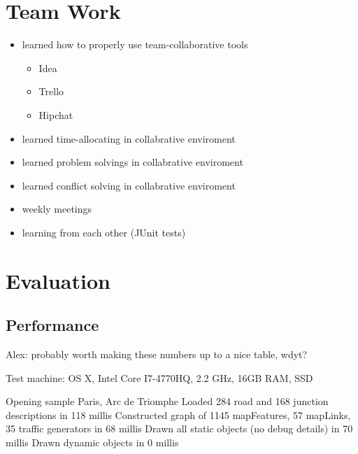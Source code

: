 \section{Team Work}

    \begin{itemize}
        \item learned how to properly use team-collaborative tools

            \begin{itemize}
                \item Idea
                \item Trello
                \item Hipchat
         \end{itemize}
        \item learned time-allocating in collabrative enviroment
        \item learned  problem solvings in collabrative enviroment
        \item learned  conflict solving in collabrative enviroment
        \item weekly meetings
        \item learning from each other (JUnit tests)

    \end {itemize}

\section{Evaluation}

\subsection{Performance}

Alex: probably worth making these numbers up to a nice table, wdyt?

Test machine: OS X, Intel Core I7-4770HQ, 2.2 GHz, 16GB RAM, SSD

Opening sample Paris, Arc de Triomphe
Loaded 284 road and 168 junction descriptions in 118 millis
Constructed graph of 1145 mapFeatures, 57 mapLinks, 35 traffic generators in 68 millis
Drawn all static objects (no debug details) in 70 millis
Drawn dynamic objects in 0 millis


